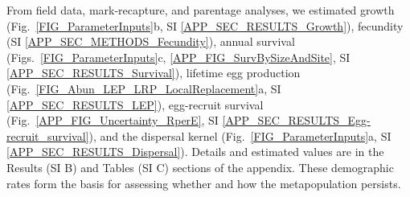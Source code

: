 \documentclass[12pt, oneside]{article}   	%
\begin{document}

From field data, mark-recapture, and parentage analyses, we estimated growth (Fig.\ \ref{FIG_ParameterInputs}b, SI \ref{APP_SEC_RESULTS_Growth}), fecundity (SI \ref{APP_SEC_METHODS_Fecundity}), annual survival (Figs.\ \ref{FIG_ParameterInputs}c, \ref{APP_FIG_SurvBySizeAndSite}, SI \ref{APP_SEC_RESULTS_Survival}), lifetime egg production (Fig.\ \ref{FIG_Abun_LEP_LRP_LocalReplacement}a, SI \ref{APP_SEC_RESULTS_LEP}), egg-recruit survival (Fig.\ \ref{APP_FIG_Uncertainty_RperE}, SI \ref{APP_SEC_RESULTS_Egg-recruit_survival}), and the dispersal kernel (Fig.\ \ref{FIG_ParameterInputs}a, SI \ref{APP_SEC_RESULTS_Dispersal}). Details and estimated values are in the Results (SI B) and Tables (SI C) sections of the appendix. These demographic rates form the basis for assessing whether and how the metapopulation persists.

\end{document}
